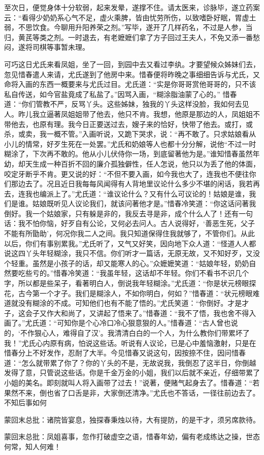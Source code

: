 \begin{parag}
    至次日，便觉身体十分软弱，起来发晕，遂撑不住。请太医来，诊脉毕，遂立药案云：“看得少奶奶系心气不足，虚火乘脾，皆由忧劳所伤，以致嗜卧好眠，胃虚土弱，不思饮食。今聊用升阳养荣之剂。”写毕，遂开了几样药名，不过是人参，当归，黄芪等类之剂。一时退去，有老嬷嬷们拿了方子回过王夫人，不免又添一番愁闷，遂将司棋等事暂未理。
\end{parag}


\begin{parag}
    可巧这日尤氏来看凤姐，坐了一回，到园中去又看过李纨。才要望候众姊妹们去，忽见惜春遣人来请，尤氏遂到了他房中来。惜春便将昨晚之事细细告诉与尤氏，又命将入画的东西一概要来与尤氏过目。尤氏道：“实是你哥哥赏他哥哥的，只不该私自传送，如今官盐竟成了私盐了。”因骂入画，“糊涂脂油蒙了心的。” 惜春道：“你们管教不严，反骂丫头。这些姊妹，独我的丫头这样没脸，我如何去见人。昨儿我立逼著凤姐姐带了他去，他只不肯。我想，他原是那边的人，凤姐姐不带他去，也原有理。我今日正要送过去，嫂子来的恰好，快带了他去。或打，或杀，或卖，我一概不管。”入画听说，又跪下哭求，说：“再不敢了。只求姑娘看从小儿的情常，好歹生死在一处罢。”尤氏和奶娘等人也都十分分解，说他“不过一时糊涂了，下次再不敢的。他从小儿伏侍你一场，到底留著他为是。”谁知惜春虽然年幼，却天生成一种百折不回的廉介孤独僻性，任人怎说，他只以为丢了他的体面，咬定牙断乎不肯。更又说的好：“不但不要入画，如今我也大了，连我也不便往你们那边去了。况且近日我每每风闻得有人背地里议论什么多少不堪的闲话，我若再去，连我也编派上了。”尤氏道：“谁议论什么？又有什么可议论的！姑娘是谁，我们是谁。姑娘既听见人议论我们，就该问著他才是。”惜春冷笑道：“你这话问著我倒好。我一个姑娘家，只有躲是非的，我反去寻是非，成个什么人了！还有一句话：我不怕你恼，好歹自有公论，又何必去问人。古人说得好，‘善恶生死，父子不能有所勖助’，何况你我二人之间。我只知道保得住我就够了，不管你们。从此以后，你们有事别累我。”尤氏听了，又气又好笑，因向地下众人道：“怪道人人都说这四丫头年轻糊涂，我只不信。你们听才一篇话，无原无故，又不知好歹，又没个轻重。虽然是小孩子的话，却又能寒人的心。”众嬷嬷笑道：“姑娘年轻，奶奶自然要吃些亏的。”惜春冷笑道：“我虽年轻，这话却不年轻。你们不看书不识几个字，所以都是些呆子，看著明白人，倒说我年轻糊涂。”尤氏道：“你是状元榜眼探花，古今第一个才子。我们是糊涂人，不如你明白，何如？”惜春道：“状元榜眼难道就没有糊涂的不成。可知他们也有不能了悟的。”尤氏笑道：“你倒好。才是才子，这会子又作大和尚了，又讲起了悟来了。”惜春道：“我不了悟，我也舍不得入画了。”尤氏道：“可知你是个心冷口冷心狠意狠的人。”惜春道：“古人曾也说的，‘不作狠心人，难得自了汉’。我清清白白的一个人，为什么教你们带累坏了我！”尤氏心内原有病，怕说这些话。听说有人议论，已是心中羞恼激射，只是在惜春分上不好发作，忍耐了大半。今见惜春又说这句，因按捺不住，因问惜春道：“怎么就带累了你了？你的丫头的不是，无故说我，我倒忍了这半日，你倒越发得了意，只管说这些话。你是千金万金的小姐，我们以后就不亲近，仔细带累了小姐的美名。即刻就叫人将入画带了过去！”说著，便赌气起身去了。惜春道：“若果然不来，倒也省了口舌是非，大家倒还清净。”尤氏也不答话，一径往前边去了。不知后事如何
\end{parag}


\begin{parag}
    \begin{note}蒙回末总批：诸院皆宴息，独探春秉烛以待，大有提防，的是干才，须另席款待。\end{note}
\end{parag}


\begin{parag}
    \begin{note}蒙回末总批：凤姐喜事，忽作打破虚空之语，惜春年幼，偏有老成练达之操，世态何常，知人何难！\end{note}
\end{parag}
